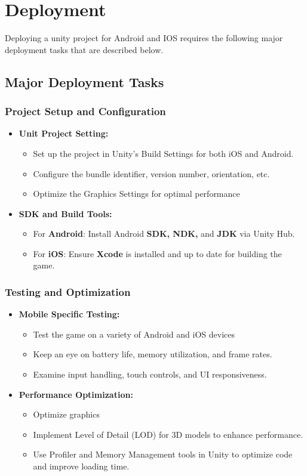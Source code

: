 \chapter{Deployment}
Deploying a unity project for Android and IOS requires the following major deployment tasks that are described below.
\section{Major Deployment Tasks}
	\subsection{Project Setup and Configuration}
	\begin{itemize}
		\item \textbf{Unit Project Setting:}
		\begin{itemize}
			\item {Set up the project in Unity's Build Settings for both iOS and Android.}
			\item {Configure the bundle identifier, version number, orientation, etc.}
			\item {Optimize the Graphics Settings for optimal performance}
		\end{itemize}
		\item \textbf{SDK and Build Tools:}
		\begin{itemize}
			\item {For \textbf{Android}: Install Android \textbf{SDK, NDK,} and \textbf{JDK} via Unity Hub.}
			\item {For \textbf{iOS}: Ensure\textbf{ Xcode} is installed and up to date for building the game.}
		\end{itemize}
	\end{itemize}
	\subsection{Testing and Optimization}
	\begin{itemize}
		\item \textbf{Mobile Specific Testing:}
		\begin{itemize}
			\item {Test the game on a variety of Android and iOS devices}
			\item {Keep an eye on battery life, memory utilization, and frame rates.}
			\item {Examine input handling, touch controls, and UI responsiveness.}
		\end{itemize}
		\item \textbf{Performance Optimization:}
		\begin{itemize}
			\item {Optimize graphics}
			\item {Implement Level of Detail (LOD) for 3D models to enhance performance.}
			\item {Use Profiler and Memory Management tools in Unity to optimize code and improve loading time.}
		\end{itemize}
	\end{itemize}
